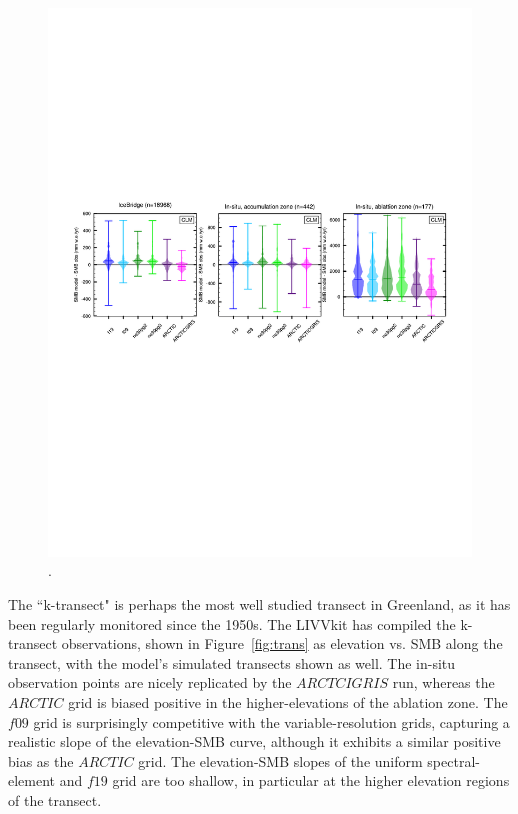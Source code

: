\documentclass[draft]{agujournal2019}
\begin{document}
\begin{figure}[t]
\begin{center}
         \includegraphics[width=130mm]{figs/temp_violens.pdf}
\end{center}
\caption{.}
\label{fig:pointdiff}
\end{figure}

The ``k-transect" is perhaps the most well studied transect in Greenland, as it has been regularly monitored since the 1950s. The LIVVkit has compiled the k-transect observations, shown in Figure~\ref{fig:trans} as elevation vs. SMB along the transect, with the model's simulated transects shown as well. The in-situ observation points are nicely replicated by the $ARCTCIGRIS$ run, whereas the $ARCTIC$ grid is biased positive in the higher-elevations of the ablation zone. The $f09$ grid is surprisingly competitive with the variable-resolution grids, capturing a realistic slope of the elevation-SMB curve, although it exhibits a similar positive bias as the $ARCTIC$ grid. The elevation-SMB slopes of the uniform spectral-element and $f19$ grid are too shallow, in particular at the higher elevation regions of the transect. 
\end{document}
